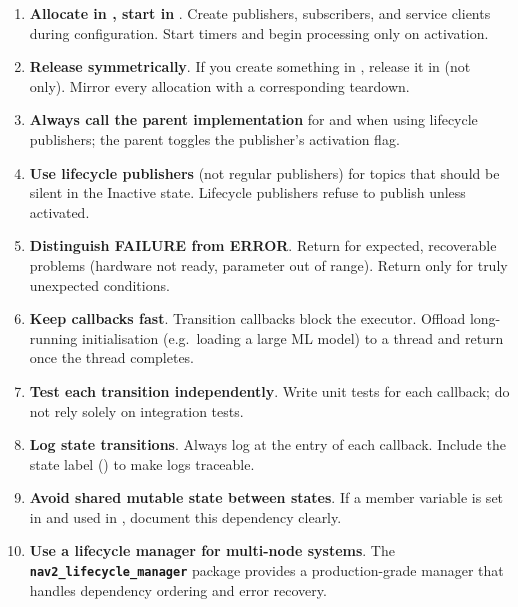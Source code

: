 \documentclass[11pt,a4paper]{csarticle}
\newcommand{\pkg}[1]{\textbf{\texttt{#1}}}
\begin{document}
\begin{enumerate}
  \item \textbf{Allocate in , start in }.
        Create publishers, subscribers, and service clients during configuration.
        Start timers and begin processing only on activation.

  \item \textbf{Release symmetrically}.  If you create something in
        , release it in  (not
         only).  Mirror every allocation with a
        corresponding teardown.

  \item \textbf{Always call the parent implementation} for
         and  when using lifecycle
        publishers; the parent toggles the publisher's activation flag.

  \item \textbf{Use lifecycle publishers} (not regular publishers) for topics
        that should be silent in the Inactive state.  Lifecycle publishers
        refuse to publish unless activated.

  \item \textbf{Distinguish FAILURE from ERROR}.  Return  for
        expected, recoverable problems (hardware not ready, parameter out of
        range).  Return  only for truly unexpected conditions.

  \item \textbf{Keep callbacks fast}.  Transition callbacks block the executor.
        Offload long-running initialisation (e.g.\ loading a large ML model)
        to a thread and return  once the thread completes.

  \item \textbf{Test each transition independently}.  Write unit tests for each
        callback; do not rely solely on integration tests.

  \item \textbf{Log state transitions}.  Always log at the entry of each
        callback.  Include the state label () to
        make logs traceable.

  \item \textbf{Avoid shared mutable state between states}.  If a member
        variable is set in  and used in
        , document this dependency clearly.

  \item \textbf{Use a lifecycle manager for multi-node systems}.  The
        \pkg{nav2\_lifecycle\_manager} package provides a production-grade
        manager that handles dependency ordering and error recovery.
\end{enumerate}
\end{document}
